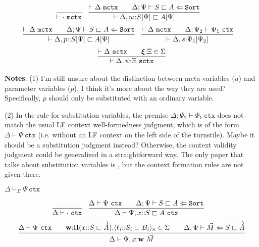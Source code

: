 \documentclass[letterpaper, 11pt]{article}
\newcommand{\Lar}{\Leftarrow}
\newcommand{\Sort}{\texttt{Sort}}
\newcommand{\ctx}{\texttt{ctx}}
\newcommand{\mctx}{\texttt{mctx}}
\newcommand{\sctx}{\texttt{sctx}}
\begin{document}
    \begin{align*}
      & \infer{\vdash \cdot \ \mctx}{} &
      & \infer{\vdash \Delta, u{::} S[\Psi] \sqsubset A[\Psi]}
        {
          \vdash \Delta \ \mctx
          &&
          \Delta ; \Psi \vdash S \sqsubset A \Lar \Sort
        }
    \end{align*}
    \begin{align*}
      & \infer{\vdash \Delta, p{::} S[\Psi] \sqsubset A[\Psi]}
        {
          \vdash \Delta \ \mctx
          &&
          \Delta ; \Psi \vdash S \sqsubset A \Lar \Sort
        } &
      & \infer{\vdash \Delta, s{:} \Psi_1[\Psi_2]}
        {
          \vdash \Delta \ \mctx
          &&
          \Delta ; \Psi_2 \vdash \Psi_1 \ \ctx
        }
    \end{align*}
    \begin{align*}
      \infer{\vdash \Delta, \psi {:} \Xi \ \sctx}
            {
              \vdash \Delta \ \sctx
              &&
              \boldsymbol{\xi} {:} \Xi \in \Sigma
            }
    \end{align*}

    \textbf{Notes}. (1) I'm still unsure about the distinction between meta-variables ($u$) and parameter variables ($p$).  I think it's more about 
    the way they are used?  Specifically, $p$ should only be substituted with an ordinary variable.

    (2) In the rule for substitution variables, the premise $\Delta ; \Psi_2 \vdash \Psi_1 \ \ctx$ does not match the usual LF context well-formedness
    judgment, which is of the form $\Delta \vdash \Psi \ \ctx$ (i.e. without an LF context on the left side of the turnstile).  Maybe it should be
    a substitution judgment instead?  Otherwise, the context validity judgment could be generalized in a straightforward way. The only paper that 
    talks about substitution variables is \cite{Pientka2008}, but the context formation rules are not given there.

    $\boxed{ \Delta \vdash_\Sigma \Psi \ \ctx}$

    \begin{align*}
      & \infer{\Delta \vdash \cdot \ \ctx}{} &
      & \infer{\Delta \vdash \Psi, x {::}S \sqsubset A \ \ctx}
        {
          \Delta \vdash \Psi \ \ctx
          &&
          \Delta ; \Psi \vdash S \sqsubset A \Lar \Sort
        }
    \end{align*}
    \begin{align*}
      \infer{\Delta \vdash \Psi, x{:} \textbf{w} \ \vec{M}}
            {
              \Delta \vdash \Psi \ \ctx
              &&
              \textbf{w} {:} \Pi (\overrightarrow{x{::}S \sqsubset A}).\langle \ell_i {::} S_i \sqsubset B_i \rangle_n \in \Sigma
              &&
              \Delta, \Psi \vdash \vec{M} \Lar \overrightarrow{S \sqsubset A}
            }
    \end{align*}
\end{document}
